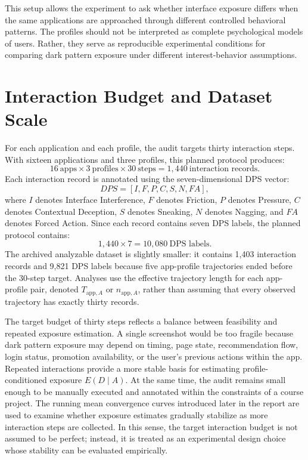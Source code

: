 This setup allows the experiment to ask whether interface exposure differs when the same applications are approached through different controlled behavioral patterns. The profiles should not be interpreted as complete psychological models of users. Rather, they serve as reproducible experimental conditions for comparing dark pattern exposure under different interest-behavior assumptions.

\section{Interaction Budget and Dataset Scale}
\label{subsec:interaction-budget}

For each application and each profile, the audit targets thirty interaction steps. With sixteen applications and three profiles, this planned protocol produces:
\[
16 \ \text{apps} \times 3 \ \text{profiles} \times 30 \ \text{steps} = 1{,}440 \ \text{interaction records}.
\]
Each interaction record is annotated using the seven-dimensional DPS vector:
\[
DPS = [I, F, P, C, S, N, FA],
\]
where \(I\) denotes Interface Interference, \(F\) denotes Friction, \(P\) denotes Pressure, \(C\) denotes Contextual Deception, \(S\) denotes Sneaking, \(N\) denotes Nagging, and \(FA\) denotes Forced Action. Since each record contains seven DPS labels, the planned protocol contains:
\[
1{,}440 \times 7 = 10{,}080 \ \text{DPS labels}.
\]
The archived analyzable dataset is slightly smaller: it contains 1{,}403 interaction records and 9{,}821 DPS labels because five app-profile trajectories ended before the 30-step target. Analyses use the effective trajectory length for each app-profile pair, denoted \(T_{\mathrm{app},A}\) or \(n_{\mathrm{app},A}\), rather than assuming that every observed trajectory has exactly thirty records.

The target budget of thirty steps reflects a balance between feasibility and repeated exposure estimation. A single screenshot would be too fragile because dark pattern exposure may depend on timing, page state, recommendation flow, login status, promotion availability, or the user's previous actions within the app. Repeated interactions provide a more stable basis for estimating profile-conditioned exposure \(E(D \mid A)\). At the same time, the audit remains small enough to be manually executed and annotated within the constraints of a course project. The running mean convergence curves introduced later in the report are used to examine whether exposure estimates gradually stabilize as more interaction steps are collected. In this sense, the target interaction budget is not assumed to be perfect; instead, it is treated as an experimental design choice whose stability can be evaluated empirically.

